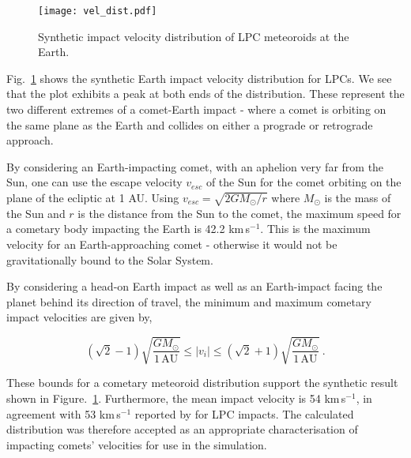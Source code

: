 \begin{figure}[t!]
    \centering
    \texttt{[image: vel\_dist.pdf]}
    \caption[Velocity distribution of Earth-impacting cometary meteoroids]{Synthetic impact velocity distribution of LPC meteoroids at the Earth.}
    \label{fig:vel_dis}
\end{figure}

\iffalse
\begin{figure*}[t!]
    \centering
    \begin{subfigure}[t]{0.5\textwidth}
        \centering
        \texttt{[image: vel\_dist.pdf]}
        \caption{Lorem ipsum}
    \end{subfigure}%
    ~ 
    \begin{subfigure}[t]{0.5\textwidth}
        \centering
        \texttt{[image: vel\_dist.pdf]}
        \caption{Lorem ipsum, lorem ipsum,Lorem ipsum, lorem ipsum,Lorem ipsum}
    \end{subfigure}
\end{figure*}
\fi

Fig.~\ref{fig:vel_dis} shows the synthetic Earth impact velocity distribution for LPCs. We see that the plot exhibits a peak at both ends of the distribution. These represent the two different extremes of a comet-Earth impact - where a comet is orbiting on the same plane as the Earth and collides on either a prograde or retrograde approach. 

By considering an Earth-impacting comet, with an aphelion very far from the Sun, one can use the escape velocity $v_{esc}$ of the Sun for the comet orbiting on the plane of the ecliptic at 1 AU. Using $v_{esc}=\sqrt{2GM_{\odot}/r}$ where $M_{\odot}$ is the mass of the Sun and $r$ is the distance from the Sun to the comet, the maximum speed for a cometary body impacting the Earth is 42.2 km$\,$s$^{-1}$. This is the maximum velocity for an Earth-approaching comet - otherwise it would not be gravitationally bound to the Solar System. 

By considering a head-on Earth impact as well as an Earth-impact facing the planet behind its direction of travel, the minimum and maximum cometary impact velocities are given by,

\begin{equation}
    (\sqrt{2}-1) \sqrt{ \dfrac{GM_{\odot}}{1 \,\mathrm{AU}} } \leq |v_i| \leq (\sqrt{2}+1) \sqrt{\dfrac{GM_{\odot}}{1 \,\mathrm{AU}}} ~.
\end{equation}
 
These bounds for a cometary meteoroid distribution support the synthetic result shown in Figure.~\ref{fig:vel_dis}. Furthermore, the mean impact velocity is 54 km$\,$s$^{-1}$, in agreement with 53 km$\,$s$^{-1}$ reported by \cite{1988merc.book..274S} for LPC impacts. The calculated distribution was therefore accepted as an appropriate characterisation of impacting comets' velocities for use in the simulation.

